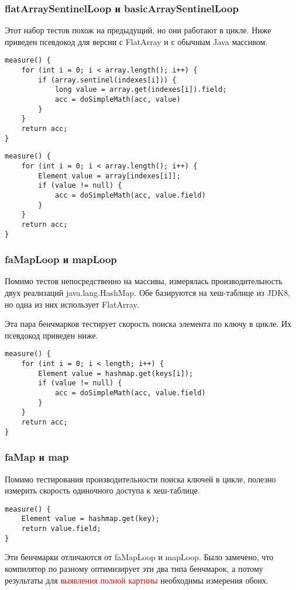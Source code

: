 \subsubsection{flatArraySentinelLoop и basicArraySentinelLoop}
Этот набор тестов похож на предыдущий, но они работают в цикле. Ниже приведен псевдокод для версии с FlatArray и с обычным Java массивом.
\begin{lstlisting}
measure() {
	for (int i = 0; i < array.length(); i++) {
		if (array.sentinel(indexes[i])) {
			long value = array.get(indexes[i]).field;
			acc = doSimpleMath(acc, value)
		}
	}
	return acc;
}
\end{lstlisting}

\begin{lstlisting}
measure() {
	for (int i = 0; i < array.length(); i++) {
		Element value = array[indexes[i]];
		if (value != null) {
			acc = doSimpleMath(acc, value.field)
		}
	}
	return acc;
}
\end{lstlisting}

\subsubsection{faMapLoop и mapLoop}
Помимо тестов непосредственно на массивы, измерялась производительность двух реализаций java.lang.HashMap. 
Обе базируются на хеш-таблице из JDK8, но одна из них использует FlatArray. 
\par
Эта пара бенчмарков тестирует скорость поиска элемента по ключу в цикле. Их псевдокод приведен ниже.
\begin{lstlisting}
measure() {
	for (int i = 0; i < length; i++) {
		Element value = hashmap.get(keys[i]);
		if (value != null) {
			acc = doSimpleMath(acc, value.field)
		}
	}
	return acc;
}
\end{lstlisting}

\subsubsection{faMap и map}
Помимо тестирования производительности поиска ключей в цикле, полезно измерить скорость одиночного доступа к хеш-таблице.
\begin{lstlisting}
measure() {
	Element value = hashmap.get(key);
	return value.field;
}
\end{lstlisting}
Эти бенчмарки отличаются от faMapLoop и mapLoop. Было замечено, что компилятор по разному оптимизирует эти два типа бенчмарок, а потому результаты для \textcolor{red}{выявления полной картины} необходимы измерения обоих. 
